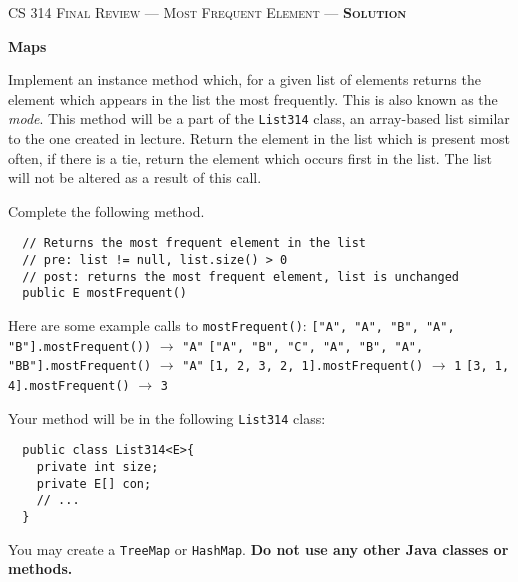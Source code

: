 \documentclass[12pt,letter]{article}
\begin{document}
\noindent\textsc{\large CS 314 Final Review --- Most Frequent Element --- \textbf{Solution}}

\vspace{6pt}
\noindent\textbf{Maps}

\vspace{2pt}
\noindent Implement an instance method which, for a given list of elements returns the element which appears in the list the most frequently. 
This is also known as the \emph{mode}. This method will be a part of the \texttt{List314} class, 
an array-based list similar to the one created in lecture. Return the element in the list which is 
present most often, if there is a tie, return the element which occurs first in the list.
The list will not be altered as a result of this call.

\vspace{4pt}
\noindent Complete the following method.
\begin{verbatim}
  // Returns the most frequent element in the list
  // pre: list != null, list.size() > 0
  // post: returns the most frequent element, list is unchanged
  public E mostFrequent()
\end{verbatim}

\vspace{4pt}
\noindent Here are some example calls to \texttt{mostFrequent()}:
\newline
\noindent \texttt{["A", "A", "B", "A", "B"].mostFrequent())} $\rightarrow$ \texttt{"A"}
\newline
\noindent \texttt{["A", "B", "C", "A", "B", "A", "BB"].mostFrequent()} $\rightarrow$ \texttt{"A"}
\newline
\noindent \texttt{[1, 2, 3, 2, 1].mostFrequent()} $\rightarrow$ \texttt{1}
\newline
\noindent \texttt{[3, 1, 4].mostFrequent()} $\rightarrow$ \texttt{3}
\newline

\noindent Your method will be in the following \texttt{List314} class:

\begin{verbatim}
  public class List314<E>{
    private int size;
    private E[] con;
    // ...
  }

\end{verbatim}

\noindent You may create a \texttt{TreeMap} or \texttt{HashMap}. 
\newline
\noindent \textbf{Do not use any other Java classes or methods.}
\end{document}
